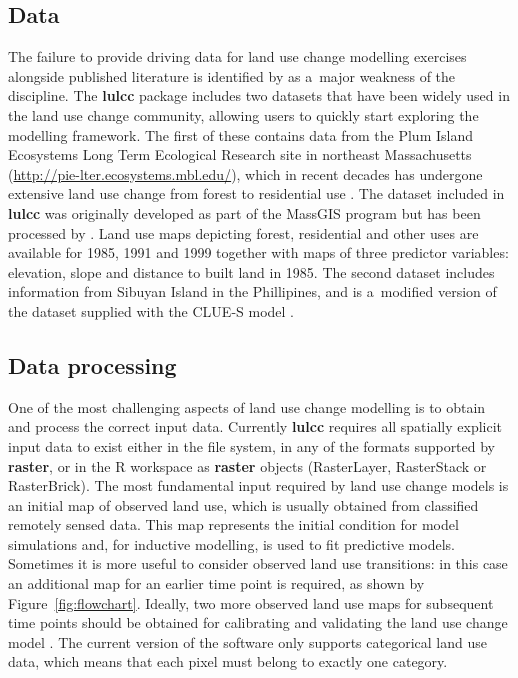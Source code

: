 \documentclass[gmdd, online, hvmath]{copernicus}
\begin{document}
\subsection{Data}

The failure to provide driving data for land use change modelling exercises alongside published literature is identified by \citet{rosa2014} as a~major weakness of the discipline. The \textbf{lulcc} package includes two datasets that have been widely used in the land use change community, allowing users to quickly start exploring the modelling framework. The first of these contains data from the Plum Island Ecosystems Long Term Ecological Research site in northeast Massachusetts (\url{http://pie-lter.ecosystems.mbl.edu/}), which in recent decades has undergone extensive land use change from forest to residential use \citep{aldwaik2012}. The dataset included in \textbf{lulcc} was originally developed as part of the MassGIS program \citep{massgis2015} but has been processed by \citet{pontius2014}. Land use maps depicting forest, residential and other uses are available for 1985, 1991 and 1999 together with maps of three predictor variables: elevation, slope and distance to built land in 1985. The second dataset includes information from Sibuyan Island in the Phillipines, and is a~modified version of the dataset supplied with the CLUE-S model \citep{verburg2002}.

\subsection{Data processing}

One of the most challenging aspects of land use change modelling is to obtain and process the correct input data. Currently \textbf{lulcc} requires all spatially explicit input data to exist either in the file system, in any of the formats supported by \textbf{raster}, or in the R workspace as \textbf{raster} objects (RasterLayer, RasterStack or RasterBrick). The most fundamental input required by land use change models is an initial map of observed land use, which is usually obtained from classified remotely sensed data. This map represents the initial condition for model simulations and, for inductive modelling, is used to fit predictive models. Sometimes it is more useful to consider observed land use transitions: in this case an additional map for an earlier time point is required, as shown by Figure~\ref{fig:flowchart}. Ideally, two more observed land use maps for subsequent time points should be obtained for calibrating and validating the land use change model \citep{pontius2004-a}. The current version of the software only supports categorical land use data, which means that each pixel must belong to exactly one category. \\
\end{document}

